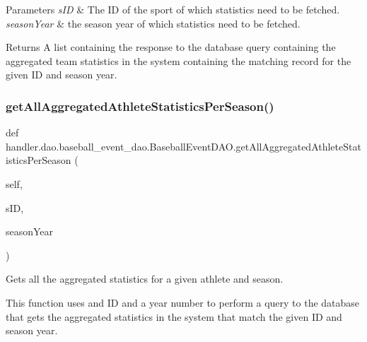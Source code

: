 \begin{DoxyParams}{Parameters}
{\em s\+ID} & The ID of the sport of which statistics need to be fetched. \\
\hline
{\em season\+Year} & the season year of which statistics need to be fetched.\\
\hline
\end{DoxyParams}
\begin{DoxyReturn}{Returns}
A list containing the response to the database query containing the aggregated team statistics in the system containing the matching record for the given ID and season year. 
\end{DoxyReturn}
\mbox{\label{classhandler_1_1dao_1_1baseball__event__dao_1_1_baseball_event_d_a_o_a644f82471bb5275d1356924a0f53b568}} 
\subsubsection{\texorpdfstring{get\+All\+Aggregated\+Athlete\+Statistics\+Per\+Season()}{getAllAggregatedAthleteStatisticsPerSeason()}}
{\footnotesize\ttfamily def handler.\+dao.\+baseball\+\_\+event\+\_\+dao.\+Baseball\+Event\+D\+A\+O.\+get\+All\+Aggregated\+Athlete\+Statistics\+Per\+Season (\begin{DoxyParamCaption}\item[{}]{self,  }\item[{}]{s\+ID,  }\item[{}]{season\+Year }\end{DoxyParamCaption})}



Gets all the aggregated statistics for a given athlete and season. 

This function uses and ID and a year number to perform a query to the database that gets the aggregated statistics in the system that match the given ID and season year.


